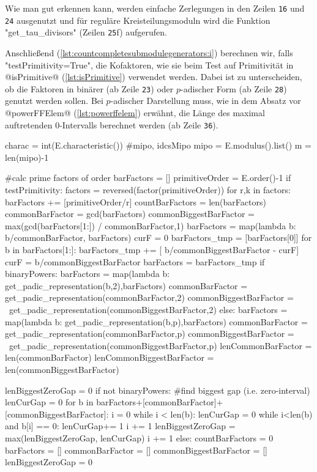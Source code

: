 Wie man gut erkennen kann, werden einfache Zerlegungen in den Zeilen
\texttt{16} und \texttt{24} ausgenutzt und für reguläre Kreisteilungsmoduln
wird die Funktion "get_tau_divisors" (Zeilen \texttt{25}f) aufgerufen.

Anschließend (\autoref{lst:countcompletesubmodulegenerators:i}) 
berechnen wir, falls "testPrimitivity=True",
die Kofaktoren, wie sie beim Test auf Primitivität
in @isPrimitive@ (\autoref{lst:isPrimitive}) verwendet werden. Dabei ist zu
unterscheiden, ob die Faktoren in binärer (ab Zeile \texttt{23})
oder $p$-adischer Form (ab Zeile \texttt{28}) genutzt werden
sollen. Bei $p$-adischer Darstellung muss, wie in dem Absatz vor 
@powerFFElem@ (\autoref{lst:powerffelem}) erwähnt, die Länge des maximal
auftretenden $0$-Intervalls berechnet werden (ab Zeile \texttt{36}).

\begin{sagecode}[caption={\texttt{countCompleteSubmoduleGenerators}
  Fortsetzung (I)}, label=lst:countcompletesubmodulegenerators:i]
    charac = int(E.characteristic())
        #mipo, idcsMipo
    mipo = E.modulus().list()
    m = len(mipo)-1

    #calc prime factors of order
    barFactors = []
    primitiveOrder = E.order()-1
    if testPrimitivity:
        factors = reversed(factor(primitiveOrder))
        for r,k in factors:
            barFactors += [primitiveOrder/r]
        countBarFactors = len(barFactors)
        commonBarFactor = gcd(barFactors)
        commonBiggestBarFactor = max(gcd(barFactors[1:]) / commonBarFactor,1)
        barFactors = map(lambda b: b/commonBarFactor, barFactors)
        curF = 0
        barFactors_tmp = [barFactors[0]]
        for b in barFactors[1:]:
            barFactors_tmp += [ b/commonBiggestBarFactor - curF]
            curF = b/commonBiggestBarFactor
        barFactors = barFactors_tmp
        if binaryPowers:
            barFactors = map(lambda b: get_padic_representation(b,2),barFactors)
            commonBarFactor = get_padic_representation(commonBarFactor,2)
            commonBiggestBarFactor = \
                    get_padic_representation(commonBiggestBarFactor,2)
        else:
            barFactors = map(lambda b: get_padic_representation(b,p),barFactors)
            commonBarFactor = get_padic_representation(commonBarFactor,p)
            commonBiggestBarFactor = \
                    get_padic_representation(commonBiggestBarFactor,p)
        lenCommonBarFactor = len(commonBarFactor)
        lenCommonBiggestBarFactor = len(commonBiggestBarFactor)

        lenBiggestZeroGap = 0
        if not binaryPowers:
            #find biggest gap (i.e. zero-interval)
            lenCurGap = 0
            for b in barFactors+[commonBarFactor]+[commonBiggestBarFactor]:
                i = 0
                while i < len(b):
                    lenCurGap = 0
                    while i<len(b) and b[i] == 0:
                        lenCurGap+= 1
                        i += 1
                    lenBiggestZeroGap = max(lenBiggestZeroGap, lenCurGap)
                    i += 1
    else:
        countBarFactors = 0
        barFactors = []
        commonBarFactor = []
        commonBiggestBarFactor = []
        lenBiggestZeroGap = 0
\end{sagecode}



